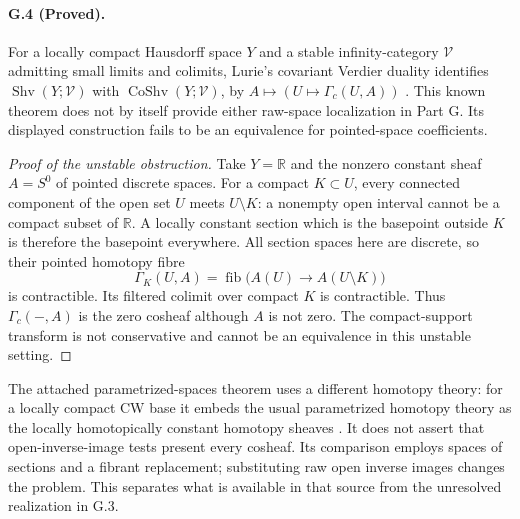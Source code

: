 \paragraph{G.4 (Proved).}
For a locally compact Hausdorff space $Y$ and a stable
infinity-category $\mathcal V$ admitting small limits and colimits,
Lurie's covariant Verdier duality identifies
$\operatorname{Shv}(Y;\mathcal V)$ with
$\operatorname{CoShv}(Y;\mathcal V)$, by
$A\mapsto(U\mapsto\Gamma_c(U,A))$
\citep[Theorem 5.5.5.1 and Proposition 5.5.5.10]{GHIJLurie2017}.
This known theorem does not by itself provide either raw-space
localization in Part G. Its displayed construction fails to be
an equivalence for pointed-space coefficients.
\begin{proof}[Proof of the unstable obstruction]
Take $Y=\mathbb R$ and the nonzero constant sheaf $A=S^0$ of
pointed discrete spaces. For a compact $K\subset U$, every
connected component of the open set $U$ meets $U\setminus K$:
a nonempty open interval cannot be a compact subset of
$\mathbb R$. A locally constant section which is the basepoint
outside $K$ is therefore the basepoint everywhere. All section
spaces here are discrete, so their pointed homotopy fibre
\[
 \Gamma_K(U,A)=\operatorname{fib}\bigl(A(U)\to A(U\setminus K)\bigr)
\]
is contractible. Its filtered colimit over compact $K$ is
contractible. Thus $\Gamma_c(-,A)$ is the zero cosheaf although
$A$ is not zero. The compact-support transform is not conservative
and cannot be an equivalence in this unstable setting.
\end{proof}

The attached parametrized-spaces theorem uses a different
homotopy theory: for a locally compact CW base it embeds the
usual parametrized homotopy theory as the locally homotopically
constant homotopy sheaves \citep{GHIJShulman2008}. It does not
assert that open-inverse-image tests present every cosheaf.
Its comparison employs spaces of sections and a fibrant
replacement; substituting raw open inverse images changes the
problem. This separates what is available in that source from
the unresolved realization in G.3.

